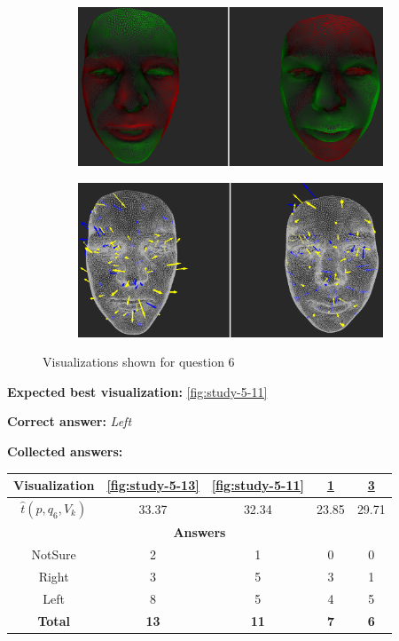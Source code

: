 \begin{figure}[h]
\begin{subfigure}{0.49\textwidth}
\includegraphics[width=\textwidth]{./screenshots/pair12.PNG}
\caption{}
\label{fig:study-5-12}
\end{subfigure}
\begin{subfigure}{0.49\textwidth}
\includegraphics[width=\textwidth]{./screenshots/pair14.PNG}
\caption{}
\label{fig:study-5-14}
\end{subfigure}
\caption{Visualizations shown for question 6}
\end{figure}
\medskip

{\bf Expected best visualization:} \ref{fig:study-5-11}
\medskip

{\bf Correct answer:} {\it Left}
\medskip

{\bf Collected answers:}

\begin{center}
\begin{tabular}{| c | c | c | c | c |}
	\hline
	Visualization & \ref{fig:study-5-13} & \ref{fig:study-5-11} & \ref{fig:study-5-12} & \ref{fig:study-5-14}\\ \hline
	\(\widehat{t}(p, q_6, V_k)\) & 33.37 & 32.34 & 23.85 & 29.71\\ \hline
	\multicolumn{5}{|c|}{\bf Answers} \\ \hline
	NotSure & 2 & 1 & 0 & 0\\ \hline
	Right & 3 & 5 & 3 & 1\\ \hline
	\rowcolor{yellow!30} Left & 8 & 5 & 4 & 5\\ \hline
	{\bf Total} & {\bf 13} & {\bf 11} & {\bf 7} & {\bf 6}\\ \hline
\end{tabular}
\end{center}
\clearpage

